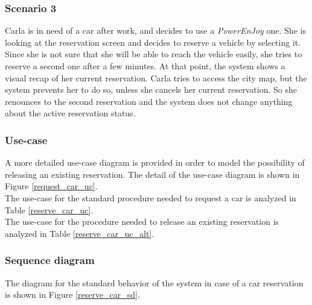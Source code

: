 \subsubsection{Scenario 3}
Carla is in need of a car after work, and decides to use a \emph{PowerEnJoy} one. She is looking at the reservation screen and decides to reserve a vehicle by selecting it. Since she is not sure that she will be able to reach the vehicle easily, she tries to reserve a second one after a few minutes. At that point, the system shows a visual recap of her current reservation. Carla tries to access the city map, but the system prevents her to do so, unless she cancels her current reservation. So she renounces to the second reservation and the system does not change anything about the active reservation status.

\subsubsection{Use-case}
A more detailed use-case diagram is provided in order to model the possibility of releasing an existing reservation. The detail of the use-case diagram is shown in Figure \ref{request_car_uc}. \\

The use-case for the standard procedure needed to request a car is analyzed in Table \ref{reserve_car_uc}. \\
The use-case for the procedure needed to release an existing reservation is analyzed in Table \ref{reserve_car_uc_alt}.

\subsubsection{Sequence diagram}
The diagram for the standard behavior of the system in case of a car reservation is shown in Figure \ref{reserve_car_sd}.

